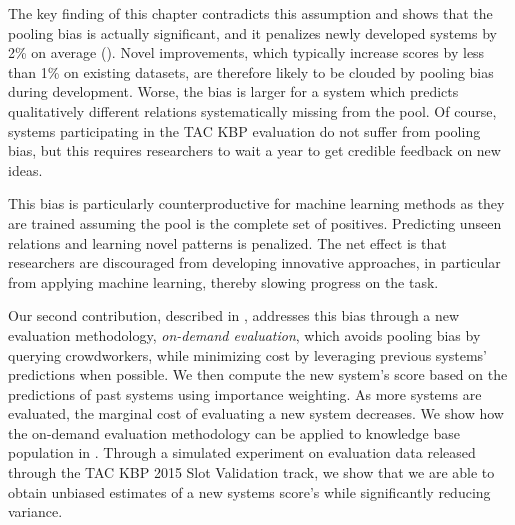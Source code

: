 The key finding of this chapter contradicts this assumption and shows that the pooling bias is actually significant, and it penalizes newly developed systems by 2\% \fone{} on average ().
Novel improvements, which typically increase scores by less than 1\% \fone{} on existing datasets, are therefore likely to be clouded by pooling bias during development.
Worse, the bias is larger for a system which predicts qualitatively different relations systematically missing from the pool.
Of course, systems participating in the TAC KBP evaluation do not suffer from pooling bias, but this requires researchers to wait a year to get credible feedback on new ideas.

This bias is particularly counterproductive for machine learning methods as they are trained assuming the pool is the complete set of positives.
Predicting unseen relations and learning novel patterns is penalized.
The net effect is that researchers are discouraged from developing innovative approaches, in particular from applying machine learning, thereby slowing progress on the task. 


Our second contribution, described in , addresses this bias through a new evaluation methodology, \emph{on-demand evaluation},
which avoids pooling bias by querying crowdworkers,
while minimizing cost by leveraging previous systems' predictions when possible.
We then compute the new system's score based on the predictions of past systems using importance weighting.
As more systems are evaluated, the marginal cost of evaluating a new system decreases.
We show how the on-demand evaluation methodology can be applied to knowledge base population in .
Through a simulated experiment on evaluation data released through the TAC KBP 2015 Slot Validation track, we show that we are able to obtain unbiased estimates of a new systems score's while significantly reducing variance.

